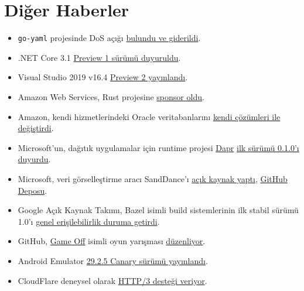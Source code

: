 \documentclass[11pt]{article}
\begin{document}
\section{Diğer Haberler}
\label{sec:org69f997d}
\begin{itemize}
\item \texttt{go-yaml} projesinde DoS açığı \href{https://raesene.github.io/blog/2019/10/15/From-stackoverflow-to-CVE/}{bulundu ve giderildi}.
\item .NET Core 3.1 \href{https://devblogs.microsoft.com/dotnet/announcing-net-core-3-1-preview-1/?WT.mc\_id=dotnetcore-reddit-bramin}{Preview 1 sürümü duyuruldu}.
\item Visual Studio 2019 v16.4 \href{https://devblogs.microsoft.com/visualstudio/fall-sports-pumpkin-spice-and-visual-studio-2019-v16-4-preview-2/}{Preview 2 yayınlandı}.
\item Amazon Web Services, Rust projesine \href{https://aws.amazon.com/tr/blogs/opensource/aws-sponsorship-of-the-rust-project/}{sponsor oldu}.
\item Amazon, kendi hizmetlerindeki Oracle veritabanlarını \href{https://aws.amazon.com/tr/blogs/aws/migration-complete-amazons-consumer-business-just-turned-off-its-final-oracle-database/}{kendi çözümleri ile
değiştirdi}.
\item Microsoft'un, dağıtık uygulamalar için runtime projesi \href{https://dapr.io/}{Dapr} \href{https://github.com/dapr/dapr/releases/tag/v0.1.0}{ilk sürümü
0.1.0'ı duyurdu}.
\item Microsoft, veri görselleştirme aracı SandDance'ı \href{https://cloudblogs.microsoft.com/opensource/2019/10/10/microsoft-open-sources-sanddance-visual-data-exploration-tool/}{açık kaynak yaptı}, \href{https://github.com/Microsoft/SandDance}{GitHub
Deposu}.
\item Google Açık Kaynak Takımı, Bazel isimli build sistemlerinin ilk stabil
sürümü 1.0'ı \href{https://opensource.googleblog.com/2019/10/bazel-reaches-10-milestone.html}{genel erişilebilirlik duruma getirdi}.
\item GitHub, \href{https://itch.io/jam/game-off-2019}{Game Off} isimli oyun yarışması \href{https://github.blog/2019-10-18-get-ready-for-game-off/}{düzenliyor}.
\item Android Emulator \href{https://androidstudio.googleblog.com/2019/10/emulator-2925-canary.html}{29.2.5 Canary sürümü yayınlandı}.
\item CloudFlare deneysel olarak \href{https://blog.cloudflare.com/experiment-with-http-3-using-nginx-and-quiche/}{HTTP/3 desteği veriyor}.

\end{itemize}
\end{document}
